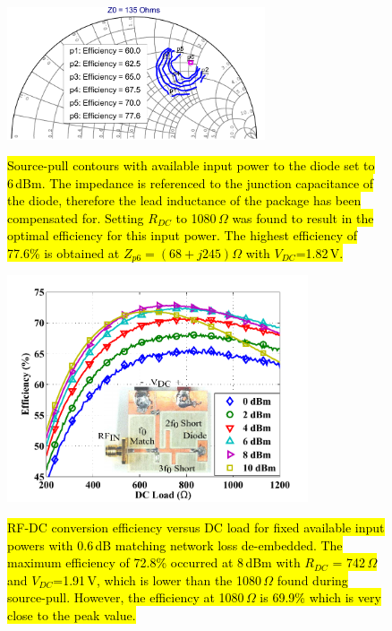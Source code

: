 \documentclass[journal]{IEEEtran}
\begin{document}
\begin{figure}
  \begin{center}
  \includegraphics[width=3.0in]{pdf/06.pdf}\\
 \caption{\hl{Source-pull contours with available input power to the diode set to 6\,dBm.  The impedance is referenced to the junction capacitance of the diode, therefore the lead inductance of the package has been compensated for. Setting $R_{DC}$ to 1080\,$\Omega$ was found to result in the optimal efficiency for this input power. The highest efficiency of 77.6\% is obtained at $Z_{p6}=(68+j245)\Omega$ with $V_{DC}$=1.82\,V.}}\label{lpcontours}
  \end{center}
\end{figure}
 


\begin{figure}
  \begin{center}
  \includegraphics[width=3.5in]{pdf/07.pdf}\\
 \caption{\hl{RF-DC conversion efficiency versus DC load for fixed available input powers with 0.6\,dB matching network loss de-embedded.  The maximum efficiency of 72.8\% occurred at 8\,dBm with $R_{DC}$ = 742\,$\Omega$ and $V_{DC}$=1.91\,V, which is lower than the 1080\,$\Omega$ found during source-pull.  However, the efficiency at 1080\,$\Omega$ is 69.9\% which is very close to the peak value.}}\label{final_dc_sweep}
  \end{center}
\end{figure}
 
\end{document}
